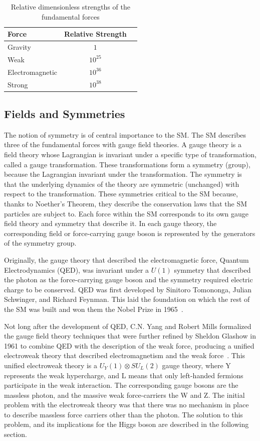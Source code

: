 \begin{table}[hbtp]
\centering
\caption{Relative dimensionless strengths of the fundamental forces}
\begin{tabular}{lcc}
\hline
Force & Relative Strength \\
\hline
Gravity & $1$ \\
Weak &  $10^{25}$ \\
Electromagnetic & $10^{36}$ \\
Strong & $10^{38}$ \\
\hline
\end{tabular}
\label{tab:force_table}
\end{table}


\subsection{Fields and Symmetries}
The notion of symmetry is of central importance to the SM.
The SM describes three of the fundamental forces with gauge field theories.
A gauge theory is a field theory whose Lagrangian is invariant under a specific type
of transformation, called a gauge transformation. These transformations form a symmetry (group), because the Lagrangian invariant under the transformation. The symmetry
is that the underlying dynamics of the theory are symmetric (unchanged) with respect to the transformation. These symmetries critical to the SM because, thanks to Noether's
Theorem, they describe the conservation laws that the SM particles are subject to. Each force within the SM corresponds to its own gauge field theory
and symmetry that describe it. In each gauge theory, the corresponding field or force-carrying gauge boson is represented by the generators of the symmetry group. 

Originally, the gauge theory that described the electromagnetic force, Quantum Electrodynamics (QED), was invariant under a $U(1)$ symmetry that described the photon as the
force-carrying gauge boson and the symmetry required electric charge to be conserved. QED was first developed by Sinitoro Tomononga, Julian Schwinger, and Richard Feynman.
This laid the foundation on which the rest of the SM was built and won them the Nobel Prize in 1965~\cite{QED}. 

Not long after the development of QED, C.N. Yang and Robert Mills formalized the gauge field theory techniques that were further refined by Sheldon Glashow in 1961 to combine QED
with the description of the weak force, producing a unified electroweak theory that described electromagnetism and the weak force~\cite{electroweak}. This unified electroweak theory is a
$U_{Y}(1) \otimes SU_{L}(2)$ gauge theory, where Y represents the weak hypercharge, and L means that only left-handed fermions participate in the weak interaction. 
The corresponding gauge bosons are the massless photon, and the massive weak force-carriers the W and Z. The initial problem with the electroweak theory was that there was no
mechanism in place to describe massless force carriers other than the photon. The solution to this problem, and its implications for the Higgs boson are described in the
following section.

